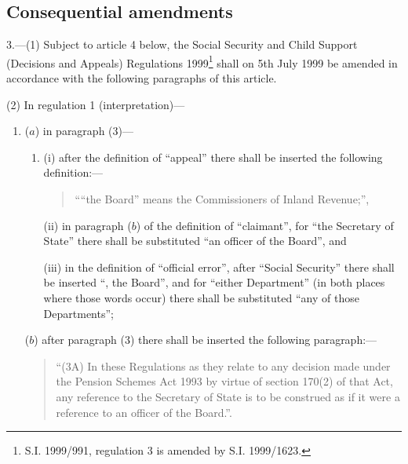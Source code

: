 \documentclass[12pt,a4paper]{article}
\begin{document}
\subsection[3. Consequential amendments]{Consequential amendments}

3.---(1)  Subject to article 4 below, the Social Security and Child Support (Decisions and Appeals) Regulations 1999\footnote{\frenchspacing S.I. 1999/991, regulation 3 is amended by S.I. 1999/1623.} shall on 5th July 1999 be amended in accordance with the following paragraphs of this article.

(2) In regulation 1 (interpretation)—
\begin{enumerate}\item[]
($a$) in paragraph (3)—
\begin{enumerate}\item[]
(i) after the definition of “appeal” there shall be inserted the following definition:—
\begin{quotation}
““the Board” means the Commissioners of Inland Revenue;”,
\end{quotation}

(ii) in paragraph ($b$)  of the definition of “claimant”, for “the Secretary of State” there shall be substituted “an officer of the Board”, and

(iii) in the definition of “official error”, after “Social Security” there shall be inserted “, the Board”, and for “either Department” (in both places where those words occur) there shall be substituted “any of those Departments”;
\end{enumerate}

($b$) after paragraph (3) there shall be inserted the following paragraph:—
\begin{quotation}
“(3A) In these Regulations as they relate to any decision made under the Pension Schemes Act 1993 by virtue of section 170(2) of that Act, any reference to the Secretary of State is to be construed as if it were a reference to an officer of the Board.”.
\end{quotation}
\end{enumerate}
\end{document}
